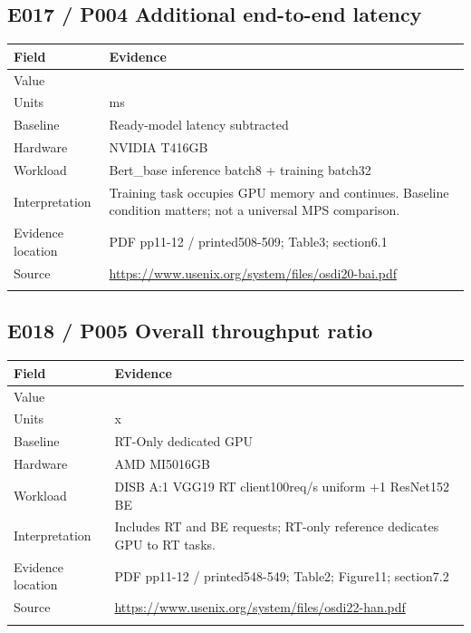 \subsection*{E017 / P004 Additional end-to-end latency}

\begin{longtable}{>{\raggedright\arraybackslash}p{}>{\raggedright\arraybackslash}p{}}
\toprule
\textbf{Field} & \textbf{Evidence}\\\midrule\endhead
Value & 338.25\\\addlinespace
Units & ms\\\addlinespace
Baseline & Ready-model latency subtracted\\\addlinespace
Hardware & NVIDIA T416GB\\\addlinespace
Workload & Bert\_base inference batch8 + training batch32\\\addlinespace
Interpretation & Training task occupies GPU memory and continues. Baseline condition matters; not a universal MPS comparison.\\\addlinespace
Evidence location & PDF pp11-12 / printed508-509; Table3; section6.1\\\addlinespace
Source & \url{https://www.usenix.org/system/files/osdi20-bai.pdf}\\\addlinespace
\bottomrule\end{longtable}

\subsection*{E018 / P005 Overall throughput ratio}

\begin{longtable}{>{\raggedright\arraybackslash}p{}>{\raggedright\arraybackslash}p{}}
\toprule
\textbf{Field} & \textbf{Evidence}\\\midrule\endhead
Value & 1.60\\\addlinespace
Units & x\\\addlinespace
Baseline & RT-Only dedicated GPU\\\addlinespace
Hardware & AMD MI5016GB\\\addlinespace
Workload & DISB A:1 VGG19 RT client100req/s uniform +1 ResNet152 BE\\\addlinespace
Interpretation & Includes RT and BE requests; RT-only reference dedicates GPU to RT tasks.\\\addlinespace
Evidence location & PDF pp11-12 / printed548-549; Table2; Figure11; section7.2\\\addlinespace
Source & \url{https://www.usenix.org/system/files/osdi22-han.pdf}\\\addlinespace
\bottomrule\end{longtable}

